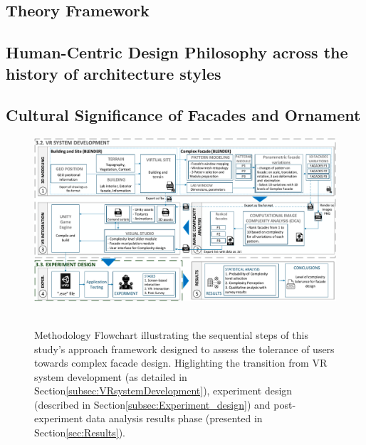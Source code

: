 \documentclass[final,5p,times]{elsarticle}%
\begin{document}
\begin{linenumbers}
\section{Theory Framework}
\label{sec:Theory Framework}


    \subsection{Human-Centric Design Philosophy across the history of architecture styles}
    \label{subsec:TimelineArchitectureStyles}
    

    \subsection{Cultural Significance of Facades and Ornament}
    \label{subsec:FacadeandOrnament}
    


            \begin{figure}[!htb]
                \centering
                \includegraphics[width= \linewidth]{Images/MethodologyFlowchart}~\caption{Methodology Flowchart illustrating the sequential steps of this study's approach framework designed to assess the tolerance of users towards complex facade design. Higlighting the transition from VR system development (as detailed in Section\ref{subsec:VRsystemDevelopment}), experiment design (described in Section\ref{subsec:Experiment_design}) and post-experiment data analysis results phase (presented in Section\ref{sec:Results}).}
                  \label{fig:MethodologyFlowchart}
            \end{figure}


\end{linenumbers}
\end{document}
